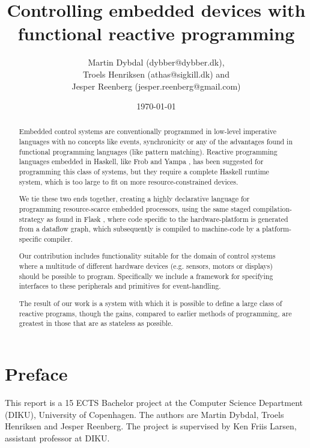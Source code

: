 \documentclass[a4paper, oneside, final]{memoir}
\title{Controlling embedded devices with functional reactive programming}
\author{Martin Dybdal (dybber@dybber.dk), \\
Troels Henriksen (athas@sigkill.dk) and \\
Jesper Reenberg (jesper.reenberg@gmail.com)
}
\date{\today}
\begin{document}
\frontmatter

\maketitle
\thispagestyle{empty}

\begin{abstract}
  Embedded control systems are conventionally programmed in low-level
  imperative languages with no concepts like events, synchronicity or
  any of the advantages found in functional programming languages
  (like pattern matching). Reactive programming languages embedded in
  Haskell, like Frob \cite{frob99} and Yampa \cite{arrowsrobotsfrp02},
  has been suggested for programming this class of systems, but they
  require a complete Haskell runtime system, which is too large to fit
  on more resource-constrained devices.

  We tie these two ends together, creating a highly declarative
  language for programming resource-scarce embedded processors, using
  the same staged com\-pi\-la\-tion-strategy as found in Flask
  \cite{flask08}, where code specific to the hardware-platform is
  generated from a dataflow graph, which subsequently is compiled to
  machine-code by a platform-specific compiler.

  Our contribution includes functionality suitable for the domain of
  control systems where a multitude of different hardware devices
  (e.g. sensors, motors or displays) should be possible to
  program. Specifically we include a framework for specifying
  interfaces to these peripherals and primitives for
  event-handling.

  The result of our work is a system with which it is possible to
  define a large class of reactive programs, though the gains,
  compared to earlier methods of programming, are greatest in those
  that are as stateless as possible.
\end{abstract}

\clearpage 
\chapter*{Preface}
This report is a 15 ECTS Bachelor project at the Computer Science
Department (DIKU), University of Copenhagen. The authors are Martin
Dybdal, Troels Henriksen and Jesper Reenberg. The project is
supervised by Ken Friis Larsen, assistant professor at DIKU.

\clearpage

\tableofcontents*
\end{document}

